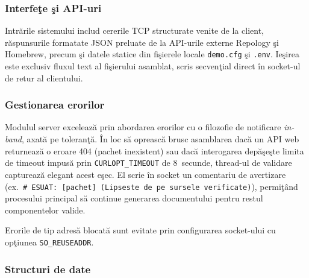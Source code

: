 \documentclass[12pt, a4paper]{article}
\begin{document}
\subsubsection{Interfe\c{t}e \c{s}i API-uri}

Intr\u{a}rile sistemului includ cererile TCP structurate venite de la client, r\u{a}spunsurile
formatate JSON preluate de la API-urile externe Repology \c{s}i Homebrew, precum \c{s}i datele statice
din fi\c{s}ierele locale \texttt{demo.cfg} \c{s}i \texttt{.env}. Ie\c{s}irea este exclusiv fluxul
text al fi\c{s}ierului asamblat, scris secven\c{t}ial direct \^{i}n socket-ul de retur al clientului.

\subsubsection{Gestionarea erorilor}

Modulul server exceleaz\u{a} prin abordarea erorilor cu o filozofie de notificare \textit{in-band},
axat\u{a} pe toleran\c{t}\u{a}. \^{I}n loc s\u{a} opreasc\u{a} brusc asamblarea dac\u{a} un API web
returneaz\u{a} o eroare 404 (pachet inexistent) sau dac\u{a} interogarea dep\u{a}\c{s}e\c{s}te limita
de timeout impus\u{a} prin \texttt{CURLOPT\_TIMEOUT} de 8~secunde, thread-ul de validare captureaz\u{a}
elegant acest e\c{s}ec. El scrie \^{i}n socket un comentariu de avertizare
(ex.\ \texttt{\# ESUAT: [pachet] (Lipseste de pe sursele verificate)}), permi\c{t}ând procesului
principal s\u{a} continue generarea documentului pentru restul componentelor valide.

Erorile de tip adres\u{a} blocat\u{a} sunt evitate prin configurarea socket-ului cu op\c{t}iunea
\texttt{SO\_REUSEADDR}.

\subsubsection{Structuri de date}
\end{document}
